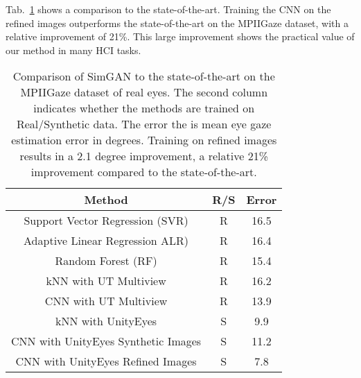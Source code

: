 \documentclass[10pt,twocolumn,letterpaper]{article}
\begin{document}
Tab.~\ref{t1} shows a comparison to the state-of-the-art. Training the CNN on the refined images outperforms the state-of-the-art on the MPIIGaze dataset, with a relative improvement of 21\%. This large improvement shows the practical value of our method in many HCI tasks.

\begin{table}
	\caption{Comparison of SimGAN to the state-of-the-art on the MPIIGaze dataset of real eyes. The second column indicates whether the methods are trained on Real/Synthetic data. The error the is mean eye gaze estimation error in degrees. Training on refined images results in a 2.1 degree improvement, a relative 21\% improvement compared to the state-of-the-art.}\label{t1}
	\begin{center}
		\begin{tabular}{|c|c|c|}
			\hline
			Method & R/S & Error  \\
			\hline
			Support Vector Regression (SVR) \cite{Schneider2014Manifold} & R & 16.5  \\
			
			Adaptive Linear Regression ALR) \cite{Lu2014Adaptive}& R & 16.4  \\
			
			Random Forest (RF) \cite{Sugano2014Learning} & R & 15.4  \\
			
			kNN with UT Multiview \cite{Zhang2015Appearance} & R & 16.2  \\
			
			CNN with UT Multiview \cite{Zhang2015Appearance} & R& 13.9  \\
			
			kNN with UnityEyes \cite{Wood} & S & 9.9  \\
			
			CNN with UnityEyes Synthetic Images & S & 11.2  \\
			
			CNN with UnityEyes Refined Images & S & 7.8  \\
			\hline
		\end{tabular}
	\end{center}
\end{table}

{\small


}
\end{document}
